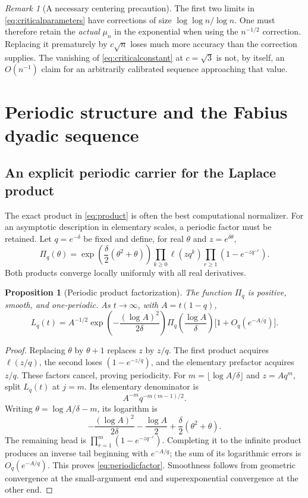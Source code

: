 \documentclass[11pt,a4paper]{article}
\numberwithin{equation}{section}
\newtheorem{proposition}[theorem]{Proposition}
\theoremstyle{definition}\newtheorem{definition}[theorem]{Definition}
\theoremstyle{remark}\newtheorem{remark}[theorem]{Remark}
\begin{document}
\begin{remark}[A necessary centering precaution]
The first two limits in \eqref{eq:criticalparameters} have corrections of size $\log\log n/\log n$. One must therefore retain the \emph{actual} $\mu_n$ in the exponential when using the $n^{-1/2}$ correction. Replacing it prematurely by $c\sqrt n$ loses much more accuracy than the correction supplies. The vanishing of \eqref{eq:criticalconstant} at $c=\sqrt3$ is not, by itself, an $O(n^{-1})$ claim for an arbitrarily calibrated sequence approaching that value.
\end{remark}

\section{Periodic structure and the Fabius dyadic sequence}
\label{sec:fabius}
\subsection{An explicit periodic carrier for the Laplace product}
The exact product in \eqref{eq:product} is often the best computational normalizer. For an asymptotic description in elementary scales, a periodic factor must be retained.
Let $q=e^{-\delta}$ be fixed and define, for real $\theta$ and $z=e^{\delta\theta}$,
\begin{equation}\label{eq:periodic}
 \Pi_q(\theta)=
 \exp\!\left(\frac\delta2(\theta^2+\theta)\right)
 \prod_{k\ge0}\ell(zq^k)
 \prod_{r\ge1}(1-e^{-zq^{-r}}).
\end{equation}
Both products converge locally uniformly with all real derivatives.

\begin{proposition}[Periodic product factorization]\label{prop:periodic}
The function $\Pi_q$ is positive, smooth, and one-periodic. As $t\to\infty$, with $A=t(1-q)$,
\begin{equation}\label{eq:periodicfactor}
 L_q(t)=A^{-1/2}\exp\!\left(-\frac{(\log A)^2}{2\delta}\right)
   \Pi_q\!\left(\frac{\log A}{\delta}\right)
   \bigl[1+O_q(e^{-A/q})\bigr].
\end{equation}
\end{proposition}
\begin{proof}
Replacing $\theta$ by $\theta+1$ replaces $z$ by $z/q$. The first product acquires $\ell(z/q)$, the second loses $(1-e^{-z/q})$, and the elementary prefactor acquires $z/q$. These factors cancel, proving periodicity.
For $m=\lfloor\log A/\delta\rfloor$ and $z=Aq^m$, split $L_q(t)$ at $j=m$. Its elementary denominator is
\[
 A^{-m}q^{-m(m-1)/2}.
\]
Writing $\theta=\log A/\delta-m$, its logarithm is
\[
 -\frac{(\log A)^2}{2\delta}-\frac{\log A}{2}
       +\frac\delta2(\theta^2+\theta).
\]
The remaining head is $\prod_{r=1}^{m}(1-e^{-zq^{-r}})$. Completing it to the infinite product produces an inverse tail beginning with $e^{-A/q}$; the sum of its logarithmic errors is $O_q(e^{-A/q})$. This proves \eqref{eq:periodicfactor}. Smoothness follows from geometric convergence at the small-argument end and superexponential convergence at the other end.
\end{proof}
\end{document}
